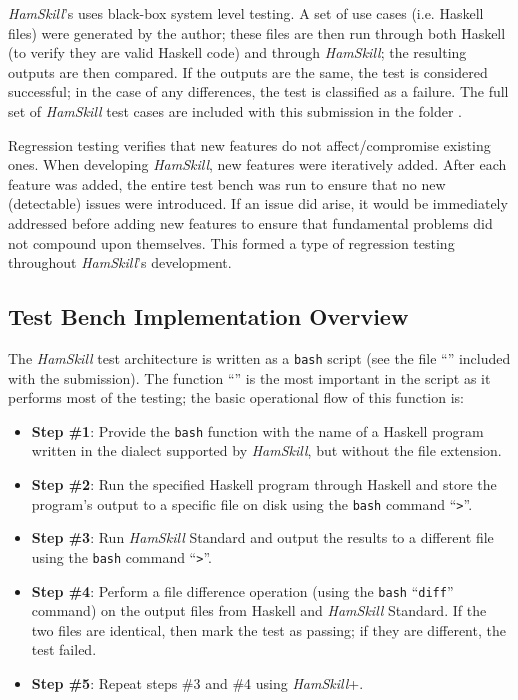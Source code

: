 \documentclass{report}
\begin{document}
\textit{HamSkill}'s uses black-box system level testing.  A set of use cases (i.e. Haskell files) were generated by the author; these files are then run through both Haskell (to verify they are valid Haskell code) and through \textit{HamSkill}; the resulting outputs are then compared.  If the outputs are the same, the test is considered successful; in the case of any differences, the test is classified as a failure.  The full set of \textit{HamSkill} test cases are included with this submission in the folder .

Regression testing verifies that new features do not affect/compromise existing ones.  When developing \textit{HamSkill}, new features were iteratively added.  After each feature was added, the entire test bench was run to ensure that no new (detectable) issues were introduced.  If an issue did arise, it would be immediately addressed before adding new features to ensure that fundamental problems did not compound upon themselves. This formed a type of regression testing throughout \textit{HamSkill}'s development.

\subsection{Test Bench Implementation Overview}

The \textit{HamSkill} test architecture is written as a \texttt{bash} script (see the file ``'' included with the submission).  The function ``'' is the most important in the script as it performs most of the testing; the basic operational flow of this function is:

\begin{itemize}

\item \textbf{Step \#1}: Provide the \texttt{bash} function with the name of a Haskell program written in the dialect supported by \textit{HamSkill}, but without the file extension.

\item \textbf{Step \#2}: Run the specified Haskell program through Haskell and store the program's output to a specific file on disk using the \texttt{bash} command ``\texttt{>}''. 

\item\label{item:runHamSkillStandard} \textbf{Step \#3}: Run \textit{HamSkill} Standard and output the results to a different file using the \texttt{bash} command ``\texttt{>}''. 

\item\label{item:diffHamSkillStandard} \textbf{Step \#4}: Perform a file difference operation (using the \texttt{bash} ``\texttt{diff}'' command) on the output files from Haskell and \textit{HamSkill} Standard.  If the two files are identical, then mark the test as passing; if they are different, the test failed.
 
\item \textbf{Step \#5}: Repeat steps \#3 and \#4 using \textit{HamSkill}+.

\end{itemize}
\end{document}
